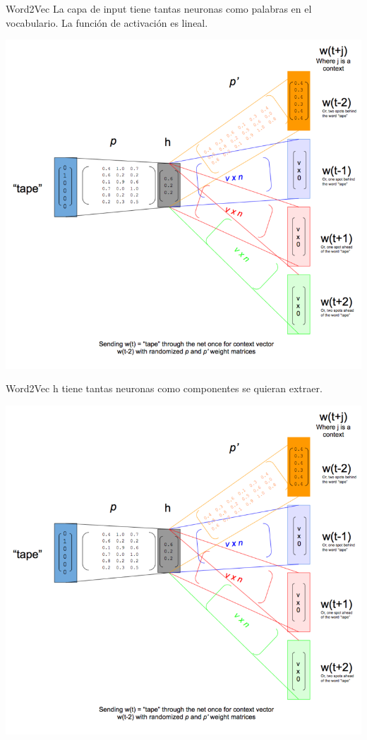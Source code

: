 \documentclass[table]{beamer}
\begin{document}
  \begin{frame}{Word2Vec}
      La capa de input tiene tantas neuronas como palabras en el vocabulario. La función de activación es lineal.

      \centering
      \includegraphics[scale=0.50]{./figures/skip-gram-exp.png}
  \end{frame}

  \begin{frame}{Word2Vec}
      h tiene tantas neuronas como componentes se quieran extraer.

      \centering
      \includegraphics[scale=0.50]{./figures/skip-gram-exp.png}
  \end{frame}
\end{document}
